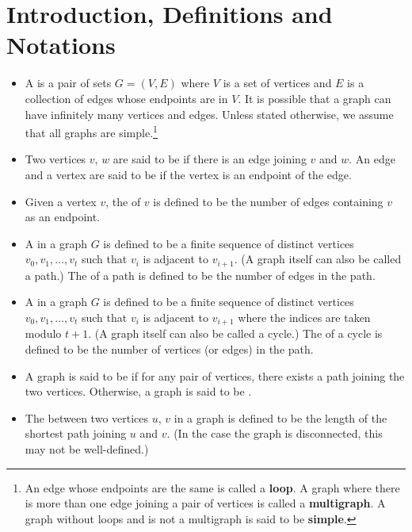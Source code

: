 \section{Introduction, Definitions and Notations}
\begin{itemize}
\item A  is a pair of sets $G=(V,E)$ where $V$ is a set of vertices and $E$ is a collection of edges whose endpoints are in $V$. It is possible that a graph can have infinitely many vertices and edges. Unless stated otherwise, we assume that all graphs are simple.\footnote{An edge whose endpoints are the same is called a \textbf{loop}. A graph where there is more than one edge joining a pair of vertices is called a \textbf{multigraph}. A graph without loops and is not a multigraph is said to be \textbf{simple}.}

\item Two vertices $v$, $w$ are said to be  if there is an edge joining $v$ and $w$. An edge and a vertex are said to be  if the vertex is an endpoint of the edge.

\item Given a vertex $v$, the  of $v$ is defined to be the number of edges containing $v$ as an endpoint.

\item A  in a graph $G$ is defined to be a finite sequence of distinct vertices $v_0,v_1,\dots,v_t$ such that $v_i$ is adjacent to $v_{i+1}$. (A graph itself can also be called a path.) The  of a path is defined to be the number of edges in the path.

\item A  in a graph $G$ is defined to be a finite sequence of distinct vertices $v_0,v_1,\dots,v_t$ such that $v_i$ is adjacent to $v_{i+1}$ where the indices are taken modulo $t+1$. (A graph itself can also be called a cycle.) The  of a cycle is defined to be the number of vertices (or edges) in the path.

\item A graph is said to be  if for any pair of vertices, there exists a path joining the two vertices. Otherwise, a graph is said to be .

\item The  between two vertices $u$, $v$ in a graph is defined to be the length of the shortest path joining $u$ and $v$. (In the case the graph is disconnected, this may not be well-defined.)


\end{itemize}
